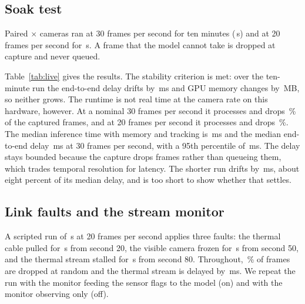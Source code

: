 \subsection{Soak test}
\label{sec:soak}
Paired \cfgLatW{}$\times$\cfgLatH{} cameras ran at 30 frames per second for ten minutes (\livSoakThirtySeconds{}\,s) and at 20 frames per second for \cfgSoakShortSeconds{}\,s. A frame that the model cannot take is dropped at capture and never queued.



Table~\ref{tab:live} gives the results. The stability criterion is met: over the ten-minute run the end-to-end delay drifts by \livSoakThirtyDriftMs{}\,ms and GPU memory changes by \livSoakThirtyGpuGrowthMb{}\,MB, so neither grows. The runtime is not real time at the camera rate on this hardware, however. At a nominal 30 frames per second it processes \livSoakThirtyFps{} and drops \livSoakThirtyDropPercent{}\,\% of the captured frames, and at 20 frames per second it processes \livSoakTwentyFps{} and drops \livSoakTwentyDropPercent{}\,\%. The median inference time with memory and tracking is \livSoakThirtyInferMedianMs{}\,ms and the median end-to-end delay \livSoakThirtyEndToEndMedianMs{}\,ms at 30 frames per second, with a 95th percentile of \livSoakThirtyEndToEndPNinetyFiveMs{}\,ms. The delay stays bounded because the capture drops frames rather than queueing them, which trades temporal resolution for latency. The shorter run drifts by \livSoakTwentyDriftMs{}\,ms, about eight percent of its median delay, and is too short to show whether that settles.

\subsection{Link faults and the stream monitor}
\label{sec:linkfaults}
A scripted run of \cfgLinkSeconds{}\,s at 20 frames per second applies three faults: the thermal cable pulled for \cfgUnplugSeconds{}\,s from second 20, the visible camera frozen for \cfgUnplugSeconds{}\,s from second 50, and the thermal stream stalled for \cfgStallSeconds{}\,s from second 80. Throughout, \cfgLinkDropPercent{}\,\% of frames are dropped at random and the thermal stream is delayed by \cfgLinkDelayMs{}\,ms. We repeat the run with the monitor feeding the sensor flags to the model (on) and with the monitor observing only (off).



